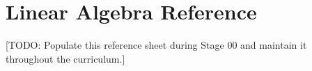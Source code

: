 
\section*{Linear Algebra Reference}

[TODO: Populate this reference sheet during Stage 00 and maintain it throughout the curriculum.]

